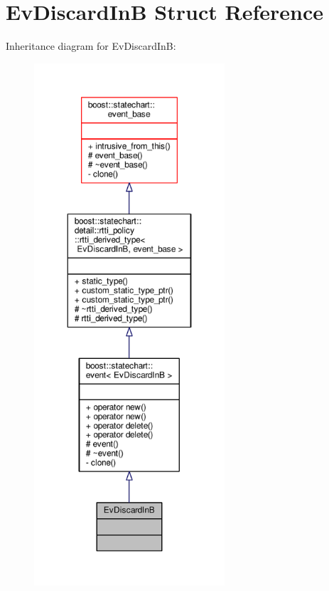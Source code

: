 \hypertarget{struct_ev_discard_in_b}{}\section{Ev\+Discard\+InB Struct Reference}
\label{struct_ev_discard_in_b}


Inheritance diagram for Ev\+Discard\+InB\+:
\nopagebreak
\begin{figure}[H]
\begin{center}
\leavevmode
\includegraphics[height=550pt]{struct_ev_discard_in_b__inherit__graph}
\end{center}
\end{figure}


